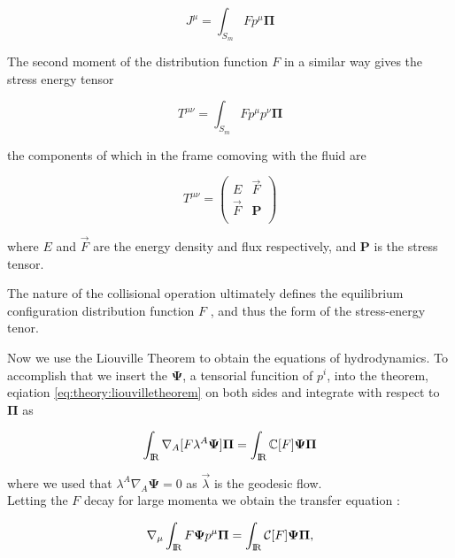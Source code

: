 \begin{equation}
J^{\mu} = \int_{S_m}Fp^{\mu}\boldsymbol{\Pi}
\end{equation}

The second moment of the distribution function $F$ in a similar way gives the stress energy tensor 

\begin{equation}
T^{\mu\nu} = \int_{S_m} F p^{\mu}p^{\nu}\boldsymbol{\Pi}
\end{equation}

the components of which in the frame comoving with the fluid are

\begin{equation}
T^{\mu\nu} = 
\begin{pmatrix}
E & \vec{F} \\
\vec{F} & \boldsymbol{P} \\
\end{pmatrix}
\end{equation}

where $E$ and $\vec{F}$ are the energy density and flux respectively, and $\boldsymbol{P}$ is the stress tensor. 

The nature of the collisional operation ultimately defines the equilibrium configuration distribution function $F$ \cite{Cercignani:2002}, and thus the form of the stress-energy tenor. 

Now we use the Liouville Theorem to obtain the equations of hydrodynamics. 
To accomplish that we insert the $\boldsymbol{\Psi}$, a tensorial funcition of $p^i$, into the theorem, eqiation \ref{eq:theory:liouvilletheorem} on both sides and integrate with respect to $\boldsymbol{\Pi}$ as

\begin{equation}
\int_{\text{I\!R}}\nabla_{A}[F\lambda^A\boldsymbol{\Psi}]\boldsymbol{\Pi}=\int_{\text{I\!R}}\mathbb{C}[F]\boldsymbol{\Psi}\boldsymbol{\Pi}
\end{equation}

where we used that $\lambda^A\nabla_{A}\boldsymbol{\Psi}=0$ as $\vec{\lambda}$ is the geodesic flow. \\

Letting the $F$ decay for large momenta we obtain the transfer equation \cite{Israel:1963,Cercignani:2002}:

\begin{equation}
\nabla_{\mu}\int_{\text{I\!R}} F\boldsymbol{\Psi}p^{\mu}\boldsymbol{\Pi} =\int_{\text{I\!R}} \mathcal{C}[F]\boldsymbol{\Psi}\boldsymbol{\Pi},
\label{eq:theory:transferequation}
\end{equation}

